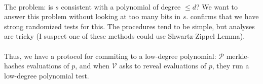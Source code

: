 \documentclass[11pt]{article}
\newcommand{\prover}{$\mathcal{P}$ }
\newcommand{\verifier}{$\mathcal{V}$ }
\begin{document}
\paragraph{} The problem: is $s$ consistent with a polynomial of degree $\leq d$? We want to answer this problem without looking at too many bits in $s$. \cite{tha22} confirms that we have strong randomized tests for this. The procedures tend to be simple, but analyses are tricky (I suspect one of these methods could use Shwartz-Zippel Lemma).

\paragraph{} Thus, we have a protocol for commiting to a low-degree polynomial: \prover merkle-hashes evaluations of $p$, and when \verifier asks to reveal evaluations of $p$, they run a low-degree polynomial test.



\end{document}
